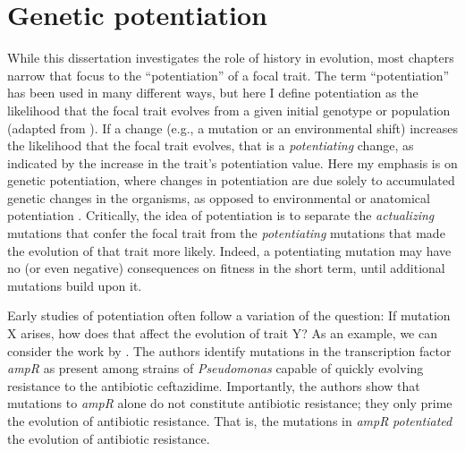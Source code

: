 \section{Genetic potentiation}

While this dissertation investigates the role of history in evolution, most chapters narrow that focus to the ``potentiation'' of a focal trait. 
The term ``potentiation'' has been used in many different ways, but here I define potentiation as the likelihood that the focal trait evolves from a given initial genotype or population (adapted from \citet{blountHistoricalContingencyEvolution2008}).
If a change (e.g., a mutation or an environmental shift) increases the likelihood that the focal trait evolves, that is a \textit{potentiating} change, as indicated by the increase in the trait's potentiation value. 
Here my emphasis is on genetic potentiation, where changes in potentiation are due solely to accumulated genetic changes in the organisms, as opposed to environmental or anatomical potentiation \citep{heydukGeneticsConvergentEvolution2019}.
Critically, the idea of potentiation is to separate the \textit{actualizing} mutations that confer the focal trait from the \textit{potentiating} mutations that made the evolution of that trait more likely.
Indeed, a potentiating mutation may have no (or even negative) consequences on fitness in the short term, until additional mutations build upon it.

Early studies of potentiation often follow a variation of the question: If mutation X arises, how does that affect the evolution of trait Y? 
As an example, we can consider the work by \citet{giffordIdentifyingExploitingGenes2018}. 
The authors identify mutations in the transcription factor \textit{ampR} as present among strains of \textit{Pseudomonas} capable of quickly evolving resistance to the antibiotic ceftazidime. 
Importantly, the authors show that mutations to \textit{ampR} alone do not constitute antibiotic resistance; they only prime the evolution of antibiotic resistance. 
That is, the mutations in \textit{ampR} \textit{potentiated} the evolution of antibiotic resistance. 

